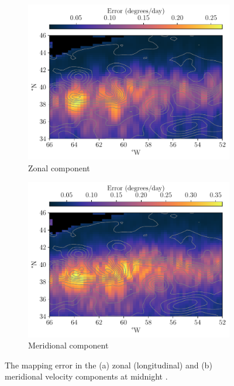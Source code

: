 \begin{figure}
	\centering
	\begin{subfigure}{0.49\textwidth}
		\includegraphics[width=\textwidth]{chp06_applications/figures/gulf_stream/u_err_0}
		\caption{Zonal component}
	\end{subfigure}
	\begin{subfigure}{0.49\textwidth}
		\includegraphics[width=\textwidth]{chp06_applications/figures/gulf_stream/v_err_0}
		\caption{Meridional component}
	\end{subfigure}
	\caption{The mapping error in the (a) zonal (longitudinal) and (b) meridional velocity components at midnight .}
	\label{fig:natl_err}
\end{figure}

